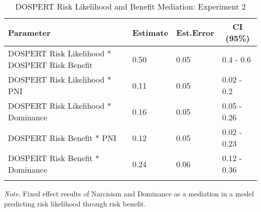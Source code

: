 \documentclass[
  donotrepeattitle,doc, 12pt, a4paper,floatsintext]{apa7}
\begin{document}
\begin{table}[ht]

\begin{center}
\begin{threeparttable}

\caption{\label{tab:MediationBRMS2Exp2}DOSPERT Risk Likelihood and Benefit Mediation: Experiment 2}

\small{

\begin{tabular}{llll}
\toprule
Parameter & \multicolumn{1}{c}{Estimate} & \multicolumn{1}{c}{Est.Error} & \multicolumn{1}{c}{CI (95\%)}\\
\midrule
DOSPERT Risk Likelihood * DOSPERT Risk Benefit & 0.50 & 0.05 & 0.4 - 0.6\\
DOSPERT Risk Likelihood * PNI & 0.11 & 0.05 & 0.02 - 0.2\\
DOSPERT Risk Likelihood * Dominance & 0.16 & 0.05 & 0.05 - 0.26\\
DOSPERT Risk Benefit * PNI & 0.12 & 0.05 & 0.02 - 0.23\\
DOSPERT Risk Benefit * Dominance & 0.24 & 0.06 & 0.12 - 0.36\\
\bottomrule
\addlinespace
\end{tabular}

}

\begin{tablenotes}[para]
\normalsize{\textit{Note.} Fixed effect results of Narcisism and Dominance as a mediation in a model predicting risk likelihood through risk benefit.}
\end{tablenotes}

\end{threeparttable}
\end{center}

\end{table}
\end{document}
